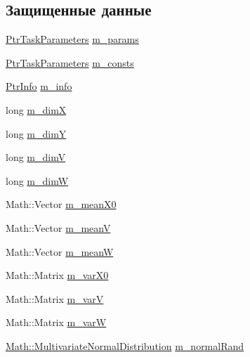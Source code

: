 \subsection*{Защищенные данные}
\begin{DoxyCompactItemize}
\item 
\hyperlink{namespace_core_a3e0e555656bf795146ebb0882e28da2f}{Ptr\+Task\+Parameters} \hyperlink{class_core_1_1_task_a99bf439867f7a4f38cde5eb142f4414a}{m\+\_\+params}
\item 
\hyperlink{namespace_core_a3e0e555656bf795146ebb0882e28da2f}{Ptr\+Task\+Parameters} \hyperlink{class_core_1_1_task_a1482a9a5e2a70c22fa58d2695a680890}{m\+\_\+consts}
\item 
\hyperlink{namespace_core_a647483da8a1266d5bbd3e9bb5cd66d08}{Ptr\+Info} \hyperlink{class_core_1_1_task_a259973874ba0b34cd7faccfd35dd683f}{m\+\_\+info}
\item 
long \hyperlink{class_core_1_1_task_a3314c516035accea22900aede28ee64b}{m\+\_\+dimX}
\item 
long \hyperlink{class_core_1_1_task_aa317bebd7f5dbfa5dc86463cb0377b12}{m\+\_\+dimY}
\item 
long \hyperlink{class_core_1_1_task_a2b117926018d3463708aa6e8657766b3}{m\+\_\+dimV}
\item 
long \hyperlink{class_core_1_1_task_a873b2d4f0d94068f327a18483a4c5318}{m\+\_\+dimW}
\item 
Math\+::\+Vector \hyperlink{class_core_1_1_task_a4482edff14b2fca2313e164614bb9693}{m\+\_\+mean\+X0}
\item 
Math\+::\+Vector \hyperlink{class_core_1_1_task_a420e36c620e30cd0f55689ce481c1391}{m\+\_\+meanV}
\item 
Math\+::\+Vector \hyperlink{class_core_1_1_task_a3391c29d286ebfae9e77cce5723f2e8c}{m\+\_\+meanW}
\item 
Math\+::\+Matrix \hyperlink{class_core_1_1_task_a06a945ef15de5b97494fd20ce88470a6}{m\+\_\+var\+X0}
\item 
Math\+::\+Matrix \hyperlink{class_core_1_1_task_af73402499755e2c2931b9d30456fd06a}{m\+\_\+varV}
\item 
Math\+::\+Matrix \hyperlink{class_core_1_1_task_af1239e6079214a8344c44b8ad4c3a23e}{m\+\_\+varW}
\item 
\hyperlink{class_math_1_1_multivariate_normal_distribution}{Math\+::\+Multivariate\+Normal\+Distribution} \hyperlink{class_core_1_1_task_a02b059438d2e6adf4a2dc8add17b2d3f}{m\+\_\+normal\+Rand}
\end{DoxyCompactItemize}


